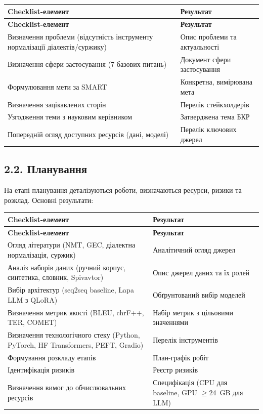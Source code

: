 \documentclass[14pt]{extarticle}
\begin{document}
\begin{longtable}{|p{}|p{}|}
\hline
\textbf{Checklist-елемент} & \textbf{Результат} \\
\hline
\endfirsthead
\hline
\textbf{Checklist-елемент} & \textbf{Результат} \\
\hline
\endhead
Визначення проблеми (відсутність інструменту нормалізації діалектів/суржику) & Опис проблеми та актуальності \\
\hline
Визначення сфери застосування (7 базових питань) & Документ сфери застосування \\
\hline
Формулювання мети за SMART & Конкретна, вимірювана мета \\
\hline
Визначення зацікавлених сторін & Перелік стейкхолдерів \\
\hline
Узгодження теми з науковим керівником & Затверджена тема БКР \\
\hline
Попередній огляд доступних ресурсів (дані, моделі) & Перелік ключових джерел \\
\hline
\end{longtable}

\subsection*{2.2. Планування}

На етапі планування деталізуються роботи, визначаються ресурси, ризики та розклад. Основні результати:

\begin{longtable}{|p{}|p{}|}
\hline
\textbf{Checklist-елемент} & \textbf{Результат} \\
\hline
\endfirsthead
\hline
\textbf{Checklist-елемент} & \textbf{Результат} \\
\hline
\endhead
Огляд літератури (NMT, GEC, діалектна нормалізація, суржик) & Аналітичний огляд джерел \\
\hline
Аналіз наборів даних (ручний корпус, синтетика, словник, Spivavtor) & Опис джерел даних та їх ролей \\
\hline
Вибір архітектур (seq2seq baseline, Lapa LLM з QLoRA) & Обґрунтований вибір моделей \\
\hline
Визначення метрик якості (BLEU, chrF++, TER, COMET) & Набір метрик з цільовими значеннями \\
\hline
Визначення технологічного стеку (Python, PyTorch, HF Transformers, PEFT, Gradio) & Перелік інструментів \\
\hline
Формування розкладу етапів & План-графік робіт \\
\hline
Ідентифікація ризиків & Реєстр ризиків \\
\hline
Визначення вимог до обчислювальних ресурсів & Специфікація (CPU для baseline, GPU $\geq$24~GB для LLM) \\
\hline
\end{longtable}
\end{document}
